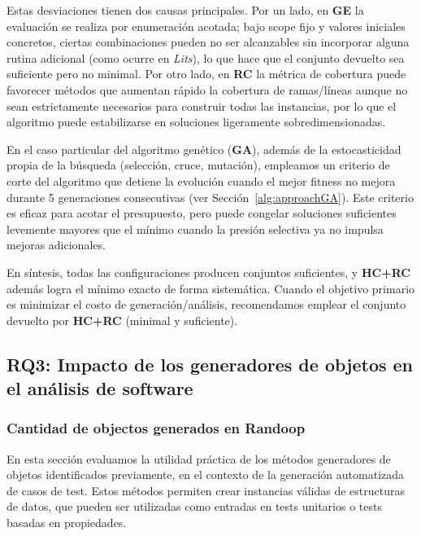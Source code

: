Estas desviaciones tienen dos causas principales. Por un lado, en \textbf{GE} la
evaluación se realiza por enumeración acotada; bajo scope fijo y valores
iniciales concretos, ciertas combinaciones pueden no ser alcanzables sin
incorporar alguna rutina adicional (como ocurre en \emph{Lits}), lo que hace que
el conjunto devuelto sea suficiente pero no minimal. Por otro lado, en
\textbf{RC} la métrica de cobertura puede favorecer métodos que
aumentan rápido la cobertura de ramas/líneas aunque no sean estrictamente
necesarios para construir todas las instancias, por lo que el algoritmo puede estabilizarse en soluciones
ligeramente sobredimensionadas.

En el caso particular del algoritmo genético (\textbf{GA}), además de la
estocasticidad propia de la búsqueda (selección, cruce, mutación), empleamos un
criterio de corte del algoritmo que detiene la evolución cuando el mejor
fitness no mejora durante 5 generaciones consecutivas (ver
Sección~\ref{alg:approachGA}). Este criterio es eficaz para acotar el presupuesto,
pero puede congelar soluciones suficientes levemente mayores que el
mínimo cuando la presión selectiva ya no impulsa mejoras adicionales.

En síntesis, todas las configuraciones producen conjuntos suficientes, y
\textbf{HC+RC} además logra el mínimo exacto de forma sistemática. Cuando
el objetivo primario es minimizar el costo de generación/análisis, recomendamos
emplear el conjunto devuelto por \textbf{HC+RC} (minimal y suficiente).



\subsection{RQ3: Impacto de los generadores de objetos en el análisis de
software}

\subsubsection{Cantidad de objectos generados en Randoop}

En esta sección evaluamos la utilidad práctica de los métodos generadores de objetos 
identificados previamente, en el contexto de la generación automatizada de casos de test. 
Estos métodos permiten crear instancias válidas de estructuras de datos, que pueden ser utilizadas como 
entradas en tests unitarios o tests basadas en propiedades.

